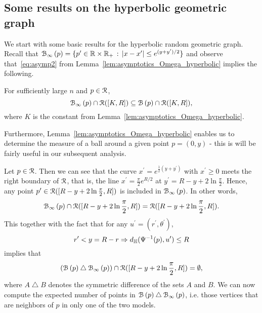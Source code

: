 
\subsection{Some results on the hyperbolic geometric graph}

We start with some basic results for the hyperbolic random geometric graph. Recall that ${\mathcal B}_{\infty}\left(p\right) = \{p^\prime \in {\ensuremath{\mathbb R}} \times {\ensuremath{\mathbb R}}_+ \, : \, |x - x^\prime| \le e^{(y +y^\prime)/2}\}$ and observe that~\eqref{eq:asymp2} from Lemma~\ref{lem:asymptotics_Omega_hyperbolic} implies the following. 
\begin{corollary}\label{cor:balls_inclusion}
For sufficiently large $n$ and $p \in {\mathcal R}$,
\begin{equation*}
 {\mathcal B}_{\infty}\left(p\right) \cap {\mathcal R} ([K,R]) \subseteq {\mathcal B}\left(p\right) \cap {\mathcal R} ([K,R]),
\end{equation*}
where $K$ is the constant from Lemma~\ref{lem:asymptotics_Omega_hyperbolic}.
\end{corollary}


Furthermore, Lemma~\ref{lem:asymptotics_Omega_hyperbolic} enables us to determine the measure of a ball around a given point $p=(0,y)$ - this is will be fairly useful in our subsequent analysis. 

Let $p \in {\mathcal R}$. Then we can see that the curve $x^\prime = e^{\frac{1}{2} (y + y^\prime)}$ with $x^\prime \geq 0$ meets the right boundary of ${\mathcal R}$, that is, the line $x^\prime = \frac{\pi}{2} e^{R/2}$ at $y^\prime = R - y + 2\ln \frac{\pi}{2}$. Hence, any point $p^{\prime} \in {\mathcal R} ([R - y + 2\ln \frac{\pi}{2}, R])$ is included in ${\mathcal B}_{\infty}\left(p\right)$. In other words,
\begin{equation*} \label{eq:P_ball_inclusion_lower}
{\mathcal B}_{\infty}\left(p\right) \cap {\mathcal R} ([R - y +2\ln \frac{\pi}{2},R]) = {\mathcal R} ([R - y + 2\ln \frac{\pi}{2},R]).
\end{equation*}
This together with the fact that for any $u^\prime = (r^\prime, \theta^\prime)$,
\[
	r^\prime < y = R -r \Rightarrow d_{\mathbb{H}}(\Psi^{-1}(p),u^\prime) \le R
\]
implies that 
\begin{equation}\label{eq:symm_diff_upper_P} 
({\mathcal B}\left(p\right) \bigtriangleup {\mathcal B}_{\infty}\left(p\right))  \cap {\mathcal R} ([R - y + 2 \ln \frac{\pi}{2},R]) = \emptyset,
\end{equation}
where $A \bigtriangleup B$ denotes the symmetric difference of the sets $A$ and $B$. We can now compute the expected number of points in ${\mathcal B}\left(p\right) \bigtriangleup {\mathcal B}_{\infty}\left(p\right)$, i.e. those vertices that are neighbors of $p$ in only one of the two models.

